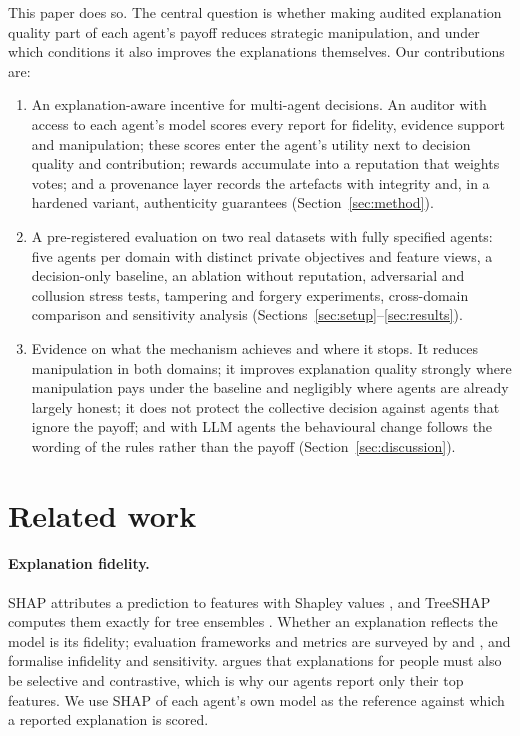 \documentclass[pdflatex,sn-basic]{sn-jnl}
\begin{document}
This paper does so. The central question is whether making audited explanation quality part
of each agent's payoff reduces strategic manipulation, and under which conditions it also
improves the explanations themselves. Our contributions are:
\begin{enumerate}
\item An explanation-aware incentive for multi-agent decisions. An auditor with access to each
agent's model scores every report for fidelity, evidence support and manipulation; these
scores enter the agent's utility next to decision quality and contribution; rewards
accumulate into a reputation that weights votes; and a provenance layer records the
artefacts with integrity and, in a hardened variant, authenticity guarantees
(Section~\ref{sec:method}).
\item A pre-registered evaluation on two real datasets with fully specified agents: five
agents per domain with distinct private objectives and feature views, a decision-only
baseline, an ablation without reputation, adversarial and collusion stress tests, tampering
and forgery experiments, cross-domain comparison and sensitivity analysis
(Sections~\ref{sec:setup}--\ref{sec:results}).
\item Evidence on what the mechanism achieves and where it stops. It reduces manipulation in
both domains; it improves explanation quality strongly where manipulation pays under the
baseline and negligibly where agents are already largely honest; it does not protect the
collective decision against agents that ignore the payoff; and with LLM agents the
behavioural change follows the wording of the rules rather than the payoff
(Section~\ref{sec:discussion}).
\end{enumerate}

\section{Related work}\label{sec:related}

\paragraph{Explanation fidelity.} SHAP attributes a prediction to features with Shapley
values \citep{lundberg2017}, and TreeSHAP computes them exactly for tree ensembles
\citep{lundberg2020}. Whether an explanation reflects the model is its fidelity; evaluation
frameworks and metrics are surveyed by \citet{doshivelez2017} and \citet{zhou2021}, and
\citet{yeh2019} formalise infidelity and sensitivity. \citet{miller2019} argues that
explanations for people must also be selective and contrastive, which is why our agents report
only their top features. We use SHAP of each agent's own model as the reference against which
a reported explanation is scored.
\end{document}
